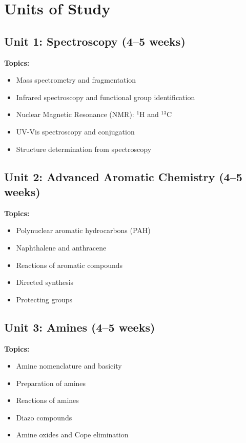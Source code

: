 \documentclass[12pt,oneside]{book}
\begin{document}
\section{Units of Study}

\subsection{Unit 1: Spectroscopy (4--5 weeks)}

\textbf{Topics:}
\begin{itemize}
    \item Mass spectrometry and fragmentation
    \item Infrared spectroscopy and functional group identification
    \item Nuclear Magnetic Resonance (NMR): $^1$H and $^{13}$C
    \item UV-Vis spectroscopy and conjugation
    \item Structure determination from spectroscopy
\end{itemize}

\subsection{Unit 2: Advanced Aromatic Chemistry (4--5 weeks)}

\textbf{Topics:}
\begin{itemize}
    \item Polynuclear aromatic hydrocarbons (PAH)
    \item Naphthalene and anthracene
    \item Reactions of aromatic compounds
    \item Directed synthesis
    \item Protecting groups
\end{itemize}

\subsection{Unit 3: Amines (4--5 weeks)}

\textbf{Topics:}
\begin{itemize}
    \item Amine nomenclature and basicity
    \item Preparation of amines
    \item Reactions of amines
    \item Diazo compounds
    \item Amine oxides and Cope elimination
\end{itemize}
\end{document}
